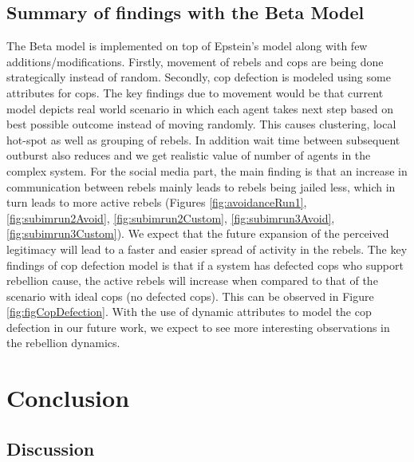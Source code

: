 \documentclass[a4paper,11pt]{article}
\begin{document}
\subsection{Summary of findings with the Beta Model}
The Beta model is implemented on top of Epstein's model \cite{epstein2002modeling} along with few additions/modifications. Firstly, movement of rebels and cops are being done strategically instead of random. Secondly, cop defection is modeled using some attributes for cops. The key findings due to movement would be that current model depicts real world scenario in which each agent takes next step based on best possible outcome instead of moving randomly. This causes clustering, local hot-spot as well as grouping of rebels. In addition wait time between subsequent outburst also reduces and we get realistic value of number of agents in the complex system. For the social media part, the main finding is that an increase in communication between rebels mainly leads to rebels being jailed less, which in turn leads to more active rebels (Figures \ref{fig:avoidanceRun1}, \ref{fig:subimrun2Avoid}, \ref{fig:subimrun2Custom}, \ref{fig:subimrun3Avoid}, \ref{fig:subimrun3Custom}). We expect that the future expansion of the perceived legitimacy will lead to a faster and easier spread of activity in the rebels. The key findings of cop defection model is that if a system has defected cops who support rebellion cause, the active rebels will increase when compared to that of the scenario with ideal cops (no defected cops). This can be observed in Figure \ref{fig:figCopDefection}. With the use of dynamic attributes to model the cop defection in our future work, we expect to see more interesting observations in the rebellion dynamics.


\section{Conclusion}
\subsection{Discussion}
\end{document}
